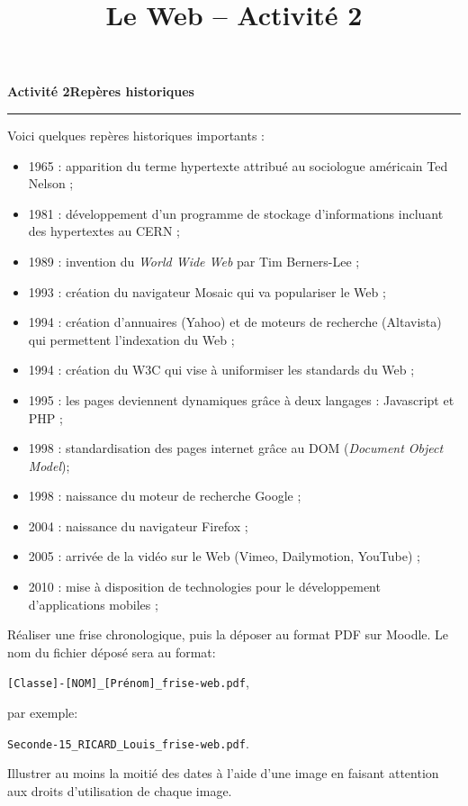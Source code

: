 \documentclass[a4paper]{article}
\begin{document}
\title{Le Web -- Activité 2}

\pagestyle{empty}

\date{}
\author{}

\maketitle{}

\thispagestyle{empty}
\noindent\textbf{Activité 2}\hfill{}\textbf{Repères historiques}
\smallskip
\hrule
\medskip

Voici quelques repères historiques importants :

\begin{itemize}
  \item 1965 : apparition du terme \og{}hypertexte\fg{} attribué au sociologue américain Ted Nelson ;
  \item 1981 : développement d'un programme de stockage d'informations incluant des hypertextes au CERN ;
  \item 1989 : invention du \textit{World Wide Web} par Tim Berners-Lee ;
  \item 1993 : création du navigateur Mosaic qui va populariser le Web ;
  \item 1994 : création d'annuaires (Yahoo) et de moteurs de recherche (Altavista) qui permettent l'indexation du Web ;
  \item 1994 : création du W3C qui vise à uniformiser les standards du Web ;
  \item 1995 : les pages deviennent dynamiques grâce à deux langages : Javascript et PHP ;
  \item 1998 : standardisation des pages internet grâce au DOM (\textit{Document Object Model});
  \item 1998 : naissance du moteur de recherche Google ;
  \item 2004 : naissance du navigateur Firefox ;
  \item 2005 : arrivée de la vidéo sur le Web (Vimeo, Dailymotion, YouTube) ;
  \item 2010 : mise à disposition de technologies pour le développement d'applications mobiles ;
\end{itemize}

Réaliser une frise chronologique, puis la déposer au format PDF sur Moodle. Le nom du fichier déposé sera au format: 

\begin{center}
  \verb|[Classe]-[NOM]_[Prénom]_frise-web.pdf|,
\end{center} 

par exemple:

\begin{center}
  \verb|Seconde-15_RICARD_Louis_frise-web.pdf|.
\end{center}

Illustrer au moins la moitié des dates à l'aide d'une image en faisant attention aux droits d'utilisation de chaque image.
\end{document}

